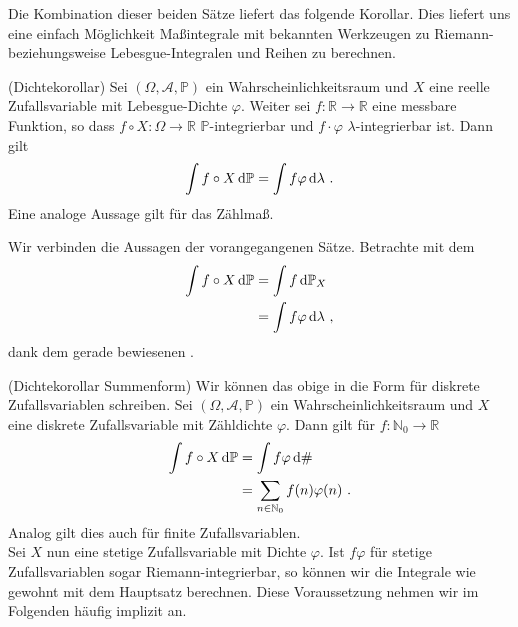 \newpage

Die Kombination dieser beiden Sätze liefert das folgende Korollar. Dies liefert uns eine einfach Möglichkeit Maßintegrale mit bekannten Werkzeugen zu Riemann- beziehungsweise Lebesgue-Integralen und Reihen zu berechnen.

\begin{Korollar}{(Dichtekorollar)}
\hypertarget{Kor:Dichtekorollar}{}Sei $(\Omega, \mathscr{A}, \mathbb{P})$ ein Wahrscheinlichkeitsraum und $X$ eine reelle Zufallsvariable mit Lebesgue-Dichte $\varphi$. Weiter sei $f: \mathbb{R} \rightarrow \mathbb{R}$ eine messbare Funktion, so dass $f \circ X: \Omega \rightarrow \mathbb{R}$ $\mathbb{P}$-integrierbar und $f \cdot \varphi$ $\lambda$-integrierbar ist. Dann gilt
\[\int f \circ X \mathop{}\!\mathrm{d} \mathbb{P} = \int f \varphi \mathop{}\!\mathrm{d} \lambda~.\]
Eine analoge Aussage gilt für das Zählmaß.
\end{Korollar}

\begin{Beweis}{}
Wir verbinden die Aussagen der vorangegangenen Sätze. Betrachte mit dem \hyperlink{Satz:Maß_und_Bildmaß}{}
\begin{align*}
\int f \circ X \mathop{}\!\mathrm{d} \mathbb{P} &= \int f \mathop{}\!\mathrm{d} \mathbb{P}_X\\
&= \int f \varphi \mathop{}\!\mathrm{d} \lambda~,
\end{align*}
dank dem gerade bewiesenen \hyperlink{Satz:Dichtesatz}{}.
\end{Beweis}

\begin{Bemerkung}{(Dichtekorollar Summenform)}
Wir können das obige \hyperlink{Kor:Dichtekorollar}{} in die Form für diskrete Zufallsvariablen schreiben. Sei $(\Omega, \mathscr{A}, \mathbb{P})$ ein Wahrscheinlichkeitsraum und $X$ eine diskrete Zufallsvariable mit Zähldichte $\varphi$. Dann gilt für $f : \mathbb{N}_0 \rightarrow \mathbb{R}$
\begin{align*}
\int f \circ X \mathop{}\!\mathrm{d} \mathbb{P} &= \int f \varphi \mathop{}\!\mathrm{d} \#\\
&= \sum_{n \in \mathbb{N}_0} f(n) \varphi(n)~.
\end{align*}
Analog gilt dies auch für finite Zufallsvariablen.\\

Sei $X$ nun eine stetige Zufallsvariable mit Dichte $\varphi$. Ist $f \varphi$ für stetige Zufallsvariablen sogar Riemann-integrierbar, so können wir die Integrale wie gewohnt mit dem Hauptsatz berechnen. Diese Voraussetzung nehmen wir im Folgenden häufig implizit an.
\end{Bemerkung}

